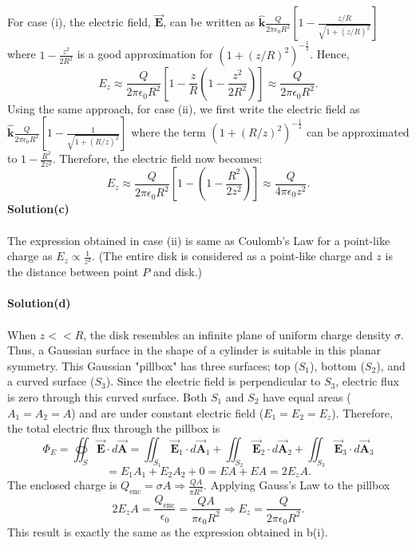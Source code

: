 \documentclass{article}
\begin{document}
\\
\\For case (i), the electric field, $\Vec{\boldsymbol{E}}$, can be written as $\boldsymbol{\hat{k}}\frac{Q}{2\pi\epsilon_0R^2}\left[1-\frac{z/R}{\sqrt{1+(z/R)^2}}\right]$ where $1-\frac{z^2}{2R^2}$ is a good approximation for $\left(1+(z/R)^2\right)^{-\frac{1}{2}}$. Hence,
\[E_z\approx\frac{Q}{2\pi\epsilon_0R^2}\left[1-\frac{z}{R}\left(1-\frac{z^2}{2R^2}\right)\right]\approx\frac{Q}{2\pi\epsilon_0R^2}.\]
Using the same approach, for case (ii), we first write the electric field as $\boldsymbol{\hat{k}}\frac{Q}{2\pi\epsilon_0R^2}\left[1-\frac{1}{\sqrt{1+(R/z)^2}}\right]$ where the term $\left(1+(R/z)^2\right)^{-\frac{1}{2}}$ can be approximated to $1-\frac{R^2}{2z^2}$. Therefore, the electric field now becomes:
\[E_z\approx\frac{Q}{2\pi\epsilon_0R^2}\left[1-\left(1-\frac{R^2}{2z^2}\right)\right]\approx\frac{Q}{4\pi\epsilon_0z^2}.\]
\textbf{Solution(c)}
\\
\\The expression obtained in case (ii) is same as Coulomb's Law for a point-like charge as $E_z\propto\frac{1}{z^2}$. (The entire disk is considered as a point-like charge and $z$ is the distance between point $P$ and disk.)
\\
\\\textbf{Solution(d)}
\\
\\When $z<<R$, the disk resembles an infinite plane of uniform charge density $\sigma$. Thus, a Gaussian surface in the shape of a cylinder is suitable in this planar symmetry. This Gaussian "pillbox" has three surfaces; top ($S_1$), bottom ($S_2$), and a curved surface ($S_3$). Since the electric field is perpendicular to $S_3$, electric flux is zero through this curved surface. Both $S_1$ and $S_2$ have equal areas ($A_1=A_2=A$) and are under constant electric field ($E_1=E_2=E_z$). Therefore, the total electric flux through the pillbox is 
\[\Phi_E=\oiint_{S}\Vec{\boldsymbol{E}}\cdot d\Vec{\boldsymbol{A}}=\iint_{S_1}\Vec{\boldsymbol{E}}_1\cdot d\Vec{\boldsymbol{A}}_1+\iint_{S_2}\Vec{\boldsymbol{E}}_2\cdot d\Vec{\boldsymbol{A}}_2+\iint_{S_3}\Vec{\boldsymbol{E}}_3\cdot d\Vec{\boldsymbol{A}}_3\]
\[=E_1A_1+E_2A_2+0=EA+EA=2E_zA.\]
The enclosed charge is $Q_{\text{enc}}=\sigma A\Rightarrow\frac{QA}{\pi R^2}$. Applying Gauss's Law to the pillbox
\[2E_zA=\frac{Q_{\text{enc}}}{\epsilon_0}=\frac{QA}{\pi\epsilon_0R^2}\Rightarrow E_z=\frac{Q}{2\pi\epsilon_0R^2}.\]
This result is exactly the same as the expression obtained in b(i).
\end{document}
